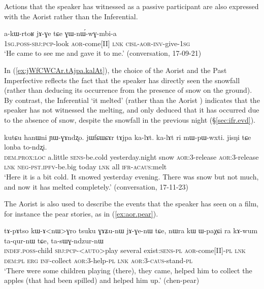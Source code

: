 Actions that the speaker has witnessed as a passive participant are also expressed with the Aorist rather than the Inferential.

\begin{exe}
\ex \label{ex:jAGE.GWnWwGmbia}
 \gll a-kɯ-rtoʁ jɤ-ɣe tɕe ɣɯ-nɯ́-wɣ-mbi-a \\
 \textsc{1sg}.\textsc{poss}-\textsc{sbj}:\textsc{pcp}-look \textsc{aor}-come[II] \textsc{lnk} \textsc{cisl}-\textsc{aor}-\textsc{inv}-give-\textsc{1sg} \\
 \glt `He came to see me and gave it to me.' (conversation, 17-09-21)
\end{exe}

In (\ref{ex:jWfCWCAr.tAjpa.kalAt}), the choice of the Aorist  and the Past Imperfective  reflects the fact that the speaker has directly seen the snowfall (rather than deducing its occurrence from the presence of snow on the ground). By contrast, the Inferential  `it melted' (rather than the Aorist ) indicates that the speaker has not witnessed the melting, and only deduced that it has occurred due to the absence of snow, despite the snowfall in the previous night (§\ref{sec:ifr.evd}).

\begin{exe}
\ex \label{ex:jWfCWCAr.tAjpa.kalAt}
 \gll kutɕu hanɯni ɲɯ-ɣɤndʐo. jɯfɕɯɕɤr tɤjpa ka-lɤt. ka-lɤt ri mɯ-pɯ-wxti. jisŋi tɕe lonba to-ndʐi. \\
 \textsc{dem}.\textsc{prox}:\textsc{loc} a.little \textsc{sens}-be.cold yesterday.night snow \textsc{aor}:3\flobv{}-release \textsc{aor}:3\flobv{}-release  \textsc{lnk} \textsc{neg}-\textsc{pst}.\textsc{ipfv}-be.big today \textsc{lnk} all \textsc{ifr}-\textsc{acaus}:melt \\
\glt `Here it is a bit cold. It snowed yesterday evening. There was snow but not much, and now it has melted completely.' (conversation, 17-11-23)
\end{exe}

The Aorist is also used to describe the events that the speaker has seen on a film, for instance the pear stories, as in (\ref{ex:aor.pear}). 

\begin{exe}
\ex \label{ex:aor.pear}
 \gll tɤ-pɤtso kɯ-ɤ<nɯ>ɣro tsuku ɣɤʑu-nɯ jɤ-ɣe-nɯ tɕe, nɯra kɯ ɯ-paχɕi ra kɤ-wum ta-qur-nɯ tɕe, ta-sɯɣ-ndzur-nɯ \\
 \textsc{indef}.\textsc{poss}-child \textsc{sbj}:\textsc{pcp}-<\textsc{auto}>play several exist:\textsc{sens}-\textsc{pl} \textsc{aor}-come[II]-\textsc{pl} \textsc{lnk} \textsc{dem}:\textsc{pl} \textsc{erg} \textsc{inf}-collect \textsc{aor}:3\flobv{}-help-\textsc{pl} \textsc{lnk} \textsc{aor}:3\flobv{}-\textsc{caus}-stand-\textsc{pl} \\
 \glt `There were some children playing (there), they came, helped him to collect the apples (that had been spilled) and helped him up.' (chen-pear)
\end{exe}

